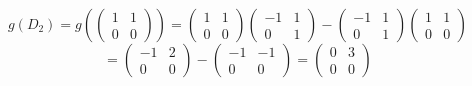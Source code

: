 \documentclass[a4paper]{article}
\theoremstyle{break}
\theoremstyle{break}
\theoremstyle{break}
\theoremstyle{break}
\begin{document}
\begin{enumerate}
        \vspace{2em}
        \[
        g(D_2) = g \left( \begin{pmatrix} 1 & 1\\0 & 0 \end{pmatrix} \right) =
        \begin{pmatrix} 
          1 & 1\\
          0 & 0
        \end{pmatrix}
        \begin{pmatrix} 
          -1 & 1\\
          0 & 1
        \end{pmatrix}
        -
        \begin{pmatrix} 
          -1 & 1\\
          0 & 1
        \end{pmatrix}
        \begin{pmatrix} 
          1 & 1\\
          0 & 0
        \end{pmatrix}
        \] 
        \[
        = \begin{pmatrix} 
          -1 & 2\\
          0 & 0
        \end{pmatrix} 
        -
        \begin{pmatrix} 
          -1 & -1\\
          0 & 0
        \end{pmatrix} 
        =
        \begin{pmatrix} 
          0 & 3\\
          0 & 0
        \end{pmatrix} 
        \] 


\end{enumerate}
\end{document}
